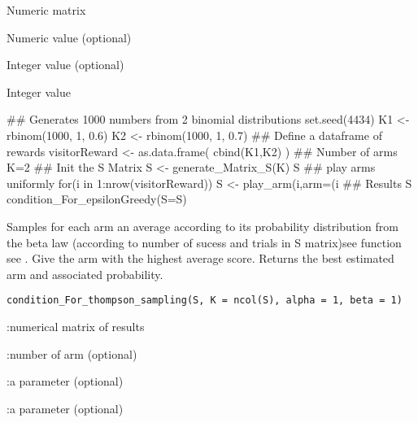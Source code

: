\documentclass[letterpaper]{book}
\begin{document}
%
\begin{Arguments}
\begin{ldescription}
\item[\code{S}] Numeric matrix

\item[\code{epsilon}] Numeric value (optional)

\item[\code{K}] Integer value (optional)
\end{ldescription}
\end{Arguments}
%
\begin{Value}
Integer value
\end{Value}
%
\begin{Examples}
\begin{ExampleCode}
## Generates 1000 numbers from 2 binomial distributions
set.seed(4434)
K1 <- rbinom(1000, 1, 0.6)
K2 <- rbinom(1000, 1, 0.7)
## Define a dataframe of rewards
visitorReward <- as.data.frame( cbind(K1,K2) )
## Number of arms
K=2
## Init the S Matrix
S <- generate_Matrix_S(K)
S
## play arms uniformly
for(i in 1:nrow(visitorReward)){
S <- play_arm(i,arm=(i%
}
## Results
S
condition_For_epsilonGreedy(S=S)
\end{ExampleCode}
\end{Examples}
%
\begin{Description}\relax
Samples for each arm an average according to its probability distribution from the beta law (according to number of sucess and trials in S matrix)see function
see .
Give the arm with the highest average score.
Returns the best estimated arm and associated probability.
\end{Description}
%
\begin{Usage}
\begin{verbatim}
condition_For_thompson_sampling(S, K = ncol(S), alpha = 1, beta = 1)
\end{verbatim}
\end{Usage}
%
\begin{Arguments}
\begin{ldescription}
\item[\code{S}] :numerical matrix of results

\item[\code{K}] :number of arm (optional)

\item[\code{alpha}] :a parameter (optional)

\item[\code{beta}] :a parameter (optional)
\end{ldescription}
\end{Arguments}
\end{document}
